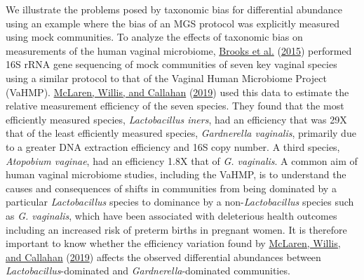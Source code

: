 \documentclass[
]{article}
\theoremstyle{definition}
\theoremstyle{definition}
\theoremstyle{definition}
\theoremstyle{definition}
\theoremstyle{remark}
\begin{document}
We illustrate the problems posed by taxonomic bias for differential abundance using an example where the bias of an MGS protocol was explicitly measured using mock communities.
To analyze the effects of taxonomic bias on measurements of the human vaginal microbiome, \protect\hyperlink{ref-brooks2015thet}{Brooks et al.} (\protect\hyperlink{ref-brooks2015thet}{2015}) performed 16S rRNA gene sequencing of mock communities of seven key vaginal species using a similar protocol to that of the Vaginal Human Microbiome Project (VaHMP).
\protect\hyperlink{ref-mclaren2019cons}{McLaren, Willis, and Callahan} (\protect\hyperlink{ref-mclaren2019cons}{2019}) used this data to estimate the relative measurement efficiency of the seven species.
They found that the most efficiently measured species, \emph{Lactobacillus iners}, had an efficiency that was 29X that of the least efficiently measured species, \emph{Gardnerella vaginalis}, primarily due to a greater DNA extraction efficiency and 16S copy number.
A third species, \emph{Atopobium vaginae}, had an efficiency 1.8X that of \emph{G. vaginalis}.
A common aim of human vaginal microbiome studies, including the VaHMP, is to understand the causes and consequences of shifts in communities from being dominated by a particular \emph{Lactobacillus} species to dominance by a non-\emph{Lactobacillus} species such as \emph{G. vaginalis}, which have been associated with deleterious health outcomes including an increased risk of preterm births in pregnant women.
It is therefore important to know whether the efficiency variation found by \protect\hyperlink{ref-mclaren2019cons}{McLaren, Willis, and Callahan} (\protect\hyperlink{ref-mclaren2019cons}{2019}) affects the observed differential abundances between \emph{Lactobacillus}-dominated and \emph{Gardnerella}-dominated communities.
\end{document}
